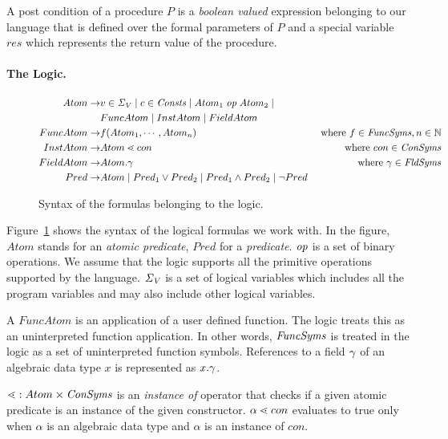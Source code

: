 A post condition of a procedure $P$ is a \emph{boolean valued} expression belonging to our language
that is defined over the formal parameters of $P$ and a special variable $res$ which represents 
the return value of the procedure. 

\paragraph{The Logic.}

\begin{figure}
\begin{align*}
Atom  \rightarrow & v \in \mathit{\Sigma_V} \; | \; c \in \mathit{Consts} \; | \; Atom_1 \; \mathit{op} \; Atom_2  \; | \;  & \\
				  & FuncAtom \; | \; InstAtom \; | \; FieldAtom & \\
FuncAtom  \rightarrow & f(Atom_1,\cdots,Atom_n) & \text{ where } f \in \mathit{FuncSyms}, n \in \mathbb{N}   \\
InstAtom  \rightarrow & Atom \lessdot con 		& \text{ where } con \in \mathit{ConSyms} \\				 
FieldAtom \rightarrow & Atom.\gamma 			& \text{ where } \gamma \in \mathit{FldSyms} \\
Pred \rightarrow & Atom \; | \; Pred_1 \vee Pred_2 \; | \; Pred_1 \wedge Pred_2 \; | \; \neg Pred & 
\end{align*}
\caption{Syntax of the formulas belonging to the logic.} \label{fig:logic-syntax}
\end{figure}
%
Figure~\ref{fig:logic-syntax} shows the syntax of the logical formulas we work with. 
In the figure, $Atom$ stands for an \emph{atomic predicate}, $Pred$ for 
a \emph{predicate}. $\mathit{op}$ is a set of binary operations. We assume that the logic 
supports all the primitive operations supported by the language. 
$\mathit{\Sigma_V}$ is a set of logical variables which includes all the program variables and may also 
include other logical variables. 

A $FuncAtom$ is an application of a user defined function. The logic
treats this as an uninterpreted function application. In other words, $\mathit{FuncSyms}$ is
treated in the logic as a set of uninterpreted function symbols.
References to a field $\gamma$ of an algebraic data type $x$ is represented as $x.\gamma$.

$\lessdot: Atom \times \mathit{ConSyms}$ is  an \emph{instance of} operator that checks 
if a given atomic predicate is an instance of the given constructor.
$\alpha \lessdot con$ evaluates to true only when $\alpha$ is an algebraic data type 
and $\alpha$ is an instance of $con$.

